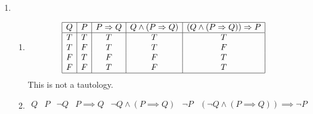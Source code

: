 \documentclass{article}
\begin{document}
\begin{enumerate}
\begin{enumerate}
\begin{enumerate}
\begin{proof}
        We have already shown above that there exists an $n$ which is both even and a difference of two perfect squares.
        Therefore, it cannot be true that for all even integers $n$ that $n$ is not the difference of two perfect squares.
      \end{proof}
    \item
      $\forall n.\ \neg E(n) \implies D(n)$.
      This statement is true.
      \begin{proof}
        In part a we proved that every odd integer could be written as the difference of two perfect squares.
        Therefore, the fact that $n$ is odd does imply that $n$ is the difference of two perfect squares.
      \end{proof}
    \item
      $\forall n.\ \neg E(n) \twowayimplies D(n)$.
      This statement is false.
      \begin{proof}
        To prove this statement we must prove both that $\neg E(n) \implies D(n)$ (which we just proved above) and that $D(n) \implies \neg E(n)$.
        This second implication cannot be true because as we have proven above there do exist even integers which are differences of two perfect squares.
      \end{proof}
    \end{enumerate}
  \end{enumerate}
\item
  \begin{enumerate}
  \item
    \begin{displaymath}
      \begin{array}{|c|c|c|c|c|c|}
        \hline
        Q & P & P \implies Q & Q \land (P \implies Q) & (Q \land (P \implies Q)) \implies P\\
        \hline
        T & T & T & T & T\\
        T & F & T & T & F\\
        F & T & F & F & T\\
        F & F & T & F & T\\
        \hline
      \end{array}
    \end{displaymath}
    This is not a tautology.
  \item
    \begin{displaymath}
      \begin{array}{|c|c|c|c|c|c|c|c|}
        \hline
        Q & P & \neg Q & P \implies Q & \neg Q \land (P \implies Q) & \neg P & (\neg Q \land (P \implies Q)) \implies \neg P\\

\end{array}
\end{displaymath}
\end{enumerate}
\end{enumerate}
\end{document}
